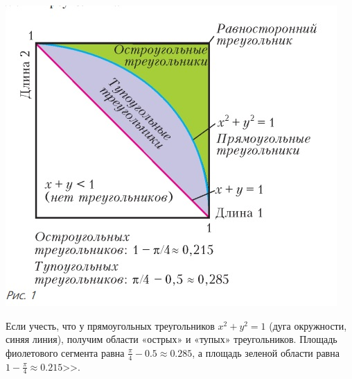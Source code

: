 \documentclass{article}
\begin{document}
{\includegraphics[scale=0.6]{img/img3.jpg}}
\par
Если учесть, что у прямоугольных треугольников $x^2 + y^2 = 1$ (дуга окружности, синяя линия), получим области «острых» и «тупых» треугольников. Площадь фиолетового сегмента равна $\frac{\pi}{4}-0.5\approx0.285$, а площадь зеленой области равна $1-\frac{\pi}{4}\approx 0.215$>>.
\end{document}
